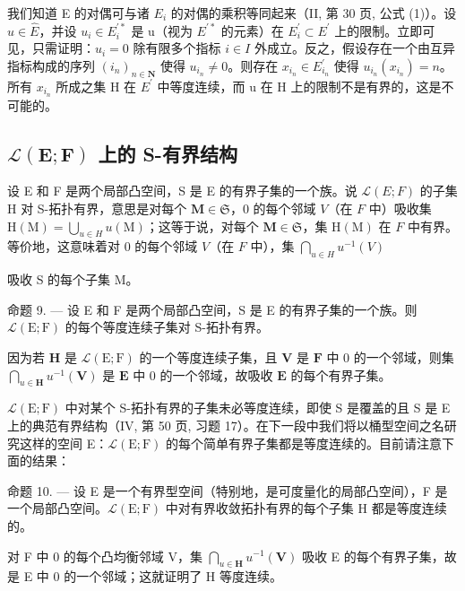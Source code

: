 我们知道 E 的对偶可与诸 \(E_{i}\) 的对偶的乘积等同起来（II, 第 30 页, 公式 (1)）。设 \(u \in \hat{E}\)，并设 \(u_{i} \in E_{i}^{\prime *}\) 是 u（视为 \(E^{\prime *}\) 的元素）在 \(E_{i}^{\prime} \subset E^{\prime}\) 上的限制。立即可见，只需证明：\(u_{i} = 0\) 除有限多个指标 \(i \in I\) 外成立。反之，假设存在一个由互异指标构成的序列 \((i_{n})_{n \in \mathbf{N}}\) 使得 \(u_{i_{n}} \neq 0\)。则存在 \(x_{i_{n}} \in E_{i_{n}}^{\prime}\) 使得 \(u_{i_{n}}(x_{i_{n}}) = n\)。所有 \(x_{i_{n}}\) 所成之集 H 在 \(E^{\prime}\) 中等度连续，而 u 在 H 上的限制不是有界的，这是不可能的。

\subsection{\texorpdfstring{\(\mathcal{L}(\mathbf{E};\mathbf{F})\) 上的 S-有界结构}{\textbackslash mathcal\{L\}(\textbackslash mathbf\{E\};\textbackslash mathbf\{F\}) 上的 S-有界结构}}

设 E 和 F 是两个局部凸空间，S 是 E 的有界子集的一个族。说 \(\mathcal{L}(E; F)\) 的子集 H 对 S-拓扑有界，意思是对每个 \(\mathbf{M} \in \mathfrak{S}\)，0 的每个邻域 \(V\)（在 \(F\) 中）吸收集 \(\mathrm{H(M)} = \bigcup_{u \in H} u(\mathrm{M})\)；这等于说，对每个 \(\mathbf{M} \in \mathfrak{S}\)，集 \(\mathrm{H(M)}\) 在 \(F\) 中有界。等价地，这意味着对 0 的每个邻域 \(V\)（在 \(F\) 中），集 \(\bigcap_{u \in H} u^{-1}(V)\)

吸收 S 的每个子集 M。

命题 9. --- 设 E 和 F 是两个局部凸空间，S 是 E 的有界子集的一个族。则 \(\mathcal{L}(\mathrm{E};\mathrm{F})\) 的每个等度连续子集对 S-拓扑有界。

因为若 \(\mathbf{H}\) 是 \(\mathcal{L}(\mathrm{E};\mathrm{F})\) 的一个等度连续子集，且 \(\mathbf{V}\) 是 \(\mathbf{F}\) 中 0 的一个邻域，则集 \(\bigcap_{u\in \mathbf{H}}u^{-1}(\mathbf{V})\) 是 \(\mathbf{E}\) 中 0 的一个邻域，故吸收 \(\mathbf{E}\) 的每个有界子集。

\(\mathcal{L}(\mathrm{E};\mathrm{F})\) 中对某个 S-拓扑有界的子集未必等度连续，即使 S 是覆盖的且 S 是 E 上的典范有界结构（IV, 第 50 页, 习题 17）。在下一段中我们将以桶型空间之名研究这样的空间 E：\(\mathcal{L}(\mathrm{E};\mathrm{F})\) 的每个简单有界子集都是等度连续的。目前请注意下面的结果：

命题 10. --- 设 E 是一个有界型空间（特别地，是可度量化的局部凸空间），F 是一个局部凸空间。\(\mathcal{L}(\mathrm{E};\mathrm{F})\) 中对有界收敛拓扑有界的每个子集 H 都是等度连续的。

对 F 中 0 的每个凸均衡邻域 V，集 \(\bigcap_{u\in\mathbf{H}}u^{-1}(\mathbf{V})\) 吸收 E 的每个有界子集，故是 E 中 0 的一个邻域；这就证明了 H 等度连续。


